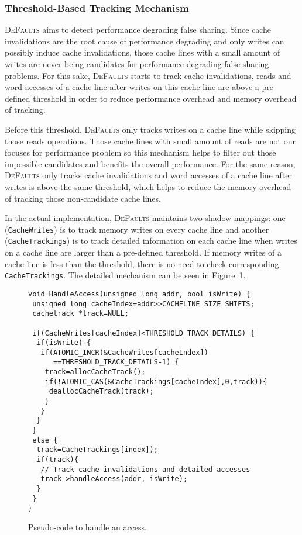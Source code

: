\documentclass[10pt]{sigplanconf}
\newcommand{\Defaults}{{\scshape DeFaults}}
\newcommand{\defaults}{{\scshape DeFaults}}
\begin{document}
\subsubsection{Threshold-Based Tracking Mechanism}
\Defaults{} aims to detect performance degrading false sharing.
Since cache invalidations are the root cause of performance degrading and only writes 
can possibly induce cache invalidations, 
those cache lines with a small amount of writes are never being candidates for 
performance degrading false sharing problems.
For this sake, \defaults{} starts to track cache invalidations, reads and word accesses 
of a cache line after writes on this cache line are above a pre-defined threshold in order 
to reduce performance overhead and memory overhead of tracking.

Before this threshold, \defaults{} only tracks writes on a cache line while skipping those 
reads operations. 
Those cache lines with small amount of reads are not our focuses for performance problem 
so this mechanism helps to filter out
those impossible candidates and benefits the overall performance. 
For the same reason, \defaults{} only tracks cache invalidations and word accesses of 
a cache line after writes is above the same threshold, which
helps to reduce the memory overhead of tracking those non-candidate cache lines.      

In the actual implementation, \defaults{} maintains two shadow mappings: 
one (\texttt{CacheWrites}) is to track memory writes 
on every cache line and another (\texttt{CacheTrackings}) is to track detailed information 
on each cache line when writes on a cache line are larger than a pre-defined threshold.
If memory writes of a cache line is less than the threshold, there is no need to check 
corresponding \texttt{CacheTrackings}. 
The detailed mechanism can be seen in Figure~\ref{fig:algorithm}.

\begin{figure}[!t]
\begin{lstlisting}
void HandleAccess(unsigned long addr, bool isWrite) {
 unsigned long cacheIndex=addr>>CACHELINE_SIZE_SHIFTS;
 cachetrack *track=NULL;

 if(CacheWrites[cacheIndex]<THRESHOLD_TRACK_DETAILS) {
  if(isWrite) {
   if(ATOMIC_INCR(&CacheWrites[cacheIndex]) 
      ==THRESHOLD_TRACK_DETAILS-1) {
    track=allocCacheTrack();
    if(!ATOMIC_CAS(&CacheTrackings[cacheIndex],0,track)){
     deallocCacheTrack(track);
    }
   }
  } 
 }
 else {
  track=CacheTrackings[index]);
  if(track){
   // Track cache invalidations and detailed accesses
   track->handleAccess(addr, isWrite);
  }
 }
}
\end{lstlisting}
\caption{Pseudo-code to handle an access.\label{fig:algorithm}}
\end{figure}
\end{document}
